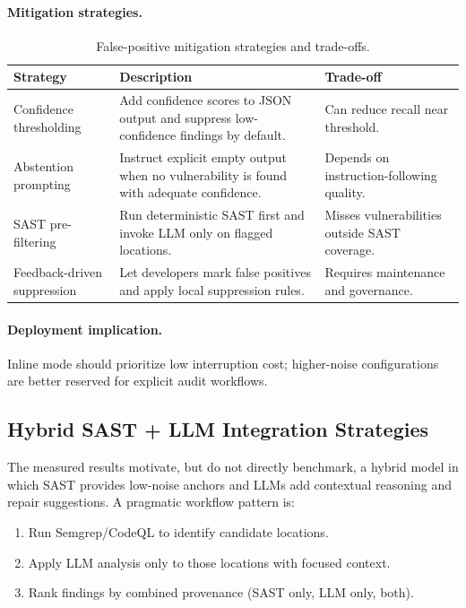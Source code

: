 \paragraph{Mitigation strategies.}
\begin{table}[H]
  \centering
  \caption{False-positive mitigation strategies and trade-offs.}
  \label{tab:fpr-mitigation}
  \small
  \begin{tabularx}{\textwidth}{p{}Xp{}}
    \toprule
    Strategy & Description & Trade-off \\
    \midrule
    Confidence thresholding & Add confidence scores to JSON output and suppress low-confidence findings by default. & Can reduce recall near threshold. \\
    Abstention prompting & Instruct explicit empty output when no vulnerability is found with adequate confidence. & Depends on instruction-following quality. \\
    SAST pre-filtering & Run deterministic SAST first and invoke LLM only on flagged locations. & Misses vulnerabilities outside SAST coverage. \\
    Feedback-driven suppression & Let developers mark false positives and apply local suppression rules. & Requires maintenance and governance. \\
    \bottomrule
  \end{tabularx}
\end{table}

\paragraph{Deployment implication.}
Inline mode should prioritize low interruption cost; higher-noise configurations are better reserved for explicit audit workflows.

\subsection{Hybrid SAST + LLM Integration Strategies}
\label{sec:eval-hybrid-sast}

The measured results motivate, but do not directly benchmark, a hybrid model in which SAST provides low-noise anchors and LLMs add contextual reasoning and repair suggestions. A pragmatic workflow pattern is:
\begin{enumerate}
  \item Run Semgrep/CodeQL to identify candidate locations.
  \item Apply LLM analysis only to those locations with focused context.
  \item Rank findings by combined provenance (SAST only, LLM only, both).
\end{enumerate}


